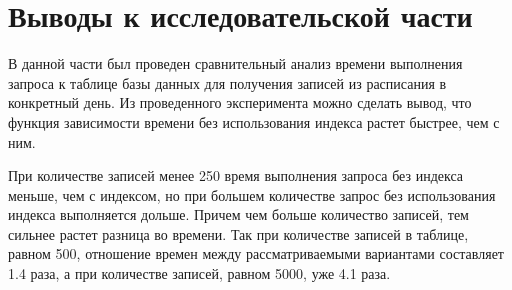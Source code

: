 \section*{Выводы к исследовательской части}

В данной части был проведен сравнительный анализ времени выполнения запроса к таблице базы данных для получения записей из расписания в конкретный день. Из проведенного эксперимента можно сделать вывод, что функция зависимости времени без использования индекса растет быстрее, чем с ним.

При количестве записей менее 250 время выполнения запроса без индекса меньше, чем с индексом, но при большем количестве запрос без использования индекса выполняется дольше. Причем чем больше количество записей, тем сильнее растет разница во времени. Так при количестве записей в таблице, равном 500, отношение времен между рассматриваемыми вариантами составляет 1.4 раза, а при количестве записей, равном 5000, уже 4.1 раза.
